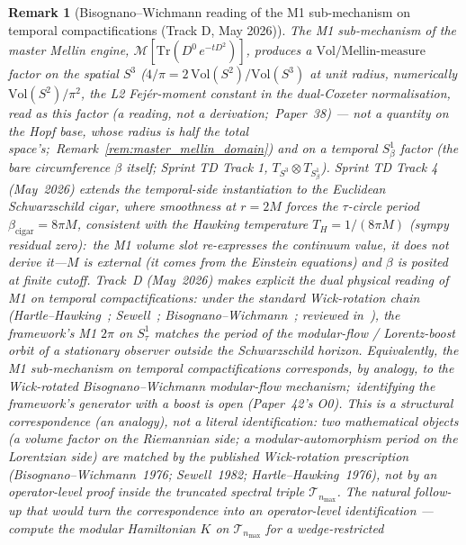 \documentclass[11pt]{article}
\providecommand{\sthree}{S^3}
\newtheorem{remark}{Remark}
\begin{document}
\begin{remark}[Bisognano--Wichmann reading of the M1 sub-mechanism on
temporal compactifications (Track D, May 2026)]
\label{rem:bisognano_wichmann_reading}
The M1 sub-mechanism of the master Mellin engine,
$\mathcal{M}[\mathrm{Tr}(D^0\, e^{-tD^2})]$, produces a
$\mathrm{Vol}/\mathrm{Mellin\text{-}measure}$ factor on the spatial
$\sthree$ ($4/\pi = 2\,\mathrm{Vol}(S^2)/\mathrm{Vol}(\sthree)$ at unit radius,
numerically $\mathrm{Vol}(S^2)/\pi^2$, the L2 Fej\'er-moment constant in
the dual-Coxeter normalisation, read as this factor (a reading, not a
derivation;\ Paper~38) --- \emph{not} a quantity on the Hopf base,
whose radius is half the total space's;\ Remark~\ref{rem:master_mellin_domain})
and on a temporal $S^1_\beta$ factor (the bare circumference $\beta$
itself; Sprint TD Track 1, $T_{S^3}\otimes T_{S^1_\beta}$).  Sprint TD
Track 4 (May~2026) extends
the temporal-side instantiation to the Euclidean Schwarzschild cigar,
where smoothness at $r=2M$ forces the $\tau$-circle period
$\beta_{\mathrm{cigar}} = 8\pi M$, consistent with the Hawking
temperature $T_H = 1/(8\pi M)$ (sympy residual zero):\ the M1 volume
slot re-expresses the continuum value, it does not derive it---$M$ is
external (it comes from the Einstein equations) and $\beta$ is posited
at finite cutoff.  Track~D
(May~2026) makes
explicit the dual physical reading of M1 on temporal compactifications:
under the standard Wick-rotation chain
(Hartle--Hawking~\cite{hartle_hawking1976};
 Sewell~\cite{sewell1982};
 Bisognano--Wichmann~\cite{bisognano_wichmann1975,bisognano_wichmann1976};
 reviewed in~\cite{witten2018_rmp}),
the framework's M1 $2\pi$ on $S^1_\tau$ matches the period of the
modular-flow / Lorentz-boost orbit of a stationary observer outside
the Schwarzschild horizon.  Equivalently, the M1 sub-mechanism on
temporal compactifications corresponds, by analogy, to the Wick-rotated
Bisognano--Wichmann modular-flow mechanism;\ identifying the framework's
generator with a boost is open (Paper~42's O0).  This is a
\emph{structural correspondence} (an analogy), not a literal identification: two
mathematical objects (a volume factor on the Riemannian
side; a modular-automorphism period on the Lorentzian side) are
matched by the published Wick-rotation prescription
(Bisognano--Wichmann~1976; Sewell~1982; Hartle--Hawking~1976), not by
an operator-level proof inside the truncated spectral triple
$\mathcal{T}_{n_{\max}}$.  The natural follow-up that would turn the
correspondence into an operator-level identification --- compute the modular
Hamiltonian $K$ on $\mathcal{T}_{n_{\max}}$ for a wedge-restricted

\end{remark}
\end{document}
